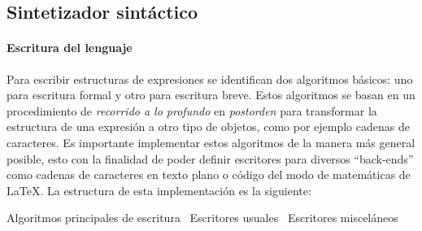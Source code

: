 \documentclass[letterpaper, twoside, openright, 11pt]{book}%
\begin{document}
\nwendcode{}\nwdocspar

\subsection{Sintetizador sintáctico}

\paragraph{Escritura del lenguaje} Para escribir estructuras de expresiones se identifican dos algoritmos básicos: uno para escritura formal y otro para escritura breve. Estos algoritmos se basan en un procedimiento de \emph{recorrido a lo profundo} en \emph{postorden} para transformar la estructura de una expresión a otro tipo de objetos, como por ejemplo cadenas de caracteres. Es importante implementar estos algoritmos de la manera más general posible, esto con la finalidad de poder definir escritores para diversos ``back-ends'' como cadenas de caracteres en texto plano o código del modo de matemáticas de \LaTeX{}. La estructura de esta implementación es la siguiente:

\nwenddocs{}\endmoddef\nwstartdeflinemarkup{}\nwenddeflinemarkup
\LA{}Algoritmos principales de escritura~{\nwtagstyle{}}\RA{}
\LA{}Escritores usuales~{\nwtagstyle{}}\RA{}
\LA{}Escritores misceláneos~{\nwtagstyle{}}\RA{}
\nwendcode{}\nwdocspar
\end{document}
